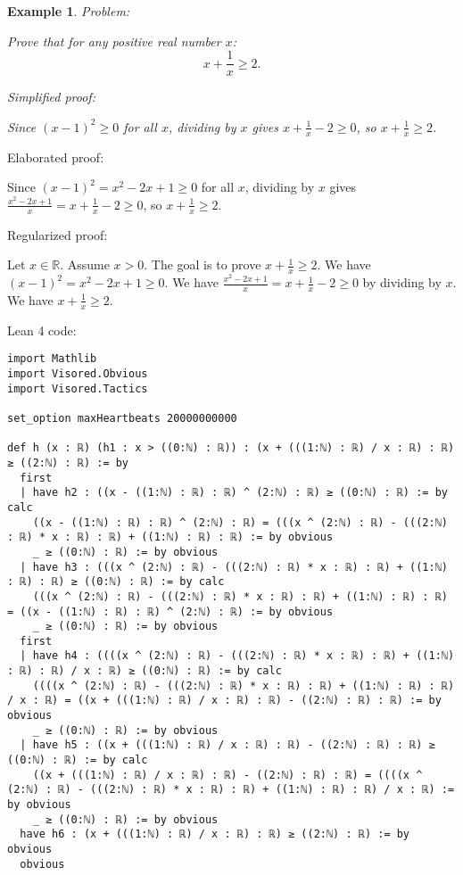 \documentclass{article}
\newtheorem{example}{Example}
\begin{document}
\begin{example}
Problem:
\begin{tcolorbox}[colback=yellow!10, width=\linewidth]
Prove that for any positive real number $x$:
    $$x + \frac{1}{x} \geq 2.$$
\end{tcolorbox}

Simplified proof:
\begin{tcolorbox}[colback=blue!10, width=\linewidth]
Since $(x-1)^2 \ge 0$ for all $x$, dividing by $x$ gives $x + \frac{1}{x} - 2 \ge 0$, so $x + \frac{1}{x} \ge 2$.
\end{tcolorbox}
\end{example}

Elaborated proof:
\begin{tcolorbox}[colback=green!10, width=\linewidth]
Since $(x-1)^2 = x^2 - 2x + 1 \ge 0$ for all $x$, dividing by $x$ gives $\frac{x^2 - 2x + 1}{x} = x + \frac{1}{x} - 2 \ge 0$, so $x + \frac{1}{x} \ge 2$.
\end{tcolorbox}

Regularized proof:
\begin{tcolorbox}[colback=red!10, width=\linewidth]
Let $x\in\mathbb{R}$. Assume $x>0$.
The goal is to prove $x + \frac{1}{x} \ge 2$.
We have ${\left(x-1\right)}^2 = x^2 - 2x + 1 \ge 0$.
We have $\frac{x^2 - 2x + 1}{x} = x + \frac{1}{x} - 2 \ge 0$ by dividing by $x$.
We have $x + \frac{1}{x} \ge 2$.
\end{tcolorbox}

Lean 4 code:
\begin{tcolorbox}[colback=white!10, width=\linewidth]
\begin{lstlisting}[language=Lean4]
import Mathlib
import Visored.Obvious
import Visored.Tactics

set_option maxHeartbeats 20000000000

def h (x : ℝ) (h1 : x > ((0:ℕ) : ℝ)) : (x + (((1:ℕ) : ℝ) / x : ℝ) : ℝ) ≥ ((2:ℕ) : ℝ) := by
  first
  | have h2 : ((x - ((1:ℕ) : ℝ) : ℝ) ^ (2:ℕ) : ℝ) ≥ ((0:ℕ) : ℝ) := by calc
    ((x - ((1:ℕ) : ℝ) : ℝ) ^ (2:ℕ) : ℝ) = (((x ^ (2:ℕ) : ℝ) - (((2:ℕ) : ℝ) * x : ℝ) : ℝ) + ((1:ℕ) : ℝ) : ℝ) := by obvious
    _ ≥ ((0:ℕ) : ℝ) := by obvious
  | have h3 : (((x ^ (2:ℕ) : ℝ) - (((2:ℕ) : ℝ) * x : ℝ) : ℝ) + ((1:ℕ) : ℝ) : ℝ) ≥ ((0:ℕ) : ℝ) := by calc
    (((x ^ (2:ℕ) : ℝ) - (((2:ℕ) : ℝ) * x : ℝ) : ℝ) + ((1:ℕ) : ℝ) : ℝ) = ((x - ((1:ℕ) : ℝ) : ℝ) ^ (2:ℕ) : ℝ) := by obvious
    _ ≥ ((0:ℕ) : ℝ) := by obvious
  first
  | have h4 : ((((x ^ (2:ℕ) : ℝ) - (((2:ℕ) : ℝ) * x : ℝ) : ℝ) + ((1:ℕ) : ℝ) : ℝ) / x : ℝ) ≥ ((0:ℕ) : ℝ) := by calc
    ((((x ^ (2:ℕ) : ℝ) - (((2:ℕ) : ℝ) * x : ℝ) : ℝ) + ((1:ℕ) : ℝ) : ℝ) / x : ℝ) = ((x + (((1:ℕ) : ℝ) / x : ℝ) : ℝ) - ((2:ℕ) : ℝ) : ℝ) := by obvious
    _ ≥ ((0:ℕ) : ℝ) := by obvious
  | have h5 : ((x + (((1:ℕ) : ℝ) / x : ℝ) : ℝ) - ((2:ℕ) : ℝ) : ℝ) ≥ ((0:ℕ) : ℝ) := by calc
    ((x + (((1:ℕ) : ℝ) / x : ℝ) : ℝ) - ((2:ℕ) : ℝ) : ℝ) = ((((x ^ (2:ℕ) : ℝ) - (((2:ℕ) : ℝ) * x : ℝ) : ℝ) + ((1:ℕ) : ℝ) : ℝ) / x : ℝ) := by obvious
    _ ≥ ((0:ℕ) : ℝ) := by obvious
  have h6 : (x + (((1:ℕ) : ℝ) / x : ℝ) : ℝ) ≥ ((2:ℕ) : ℝ) := by obvious
  obvious

\end{lstlisting}
\end{tcolorbox}
\end{document}
